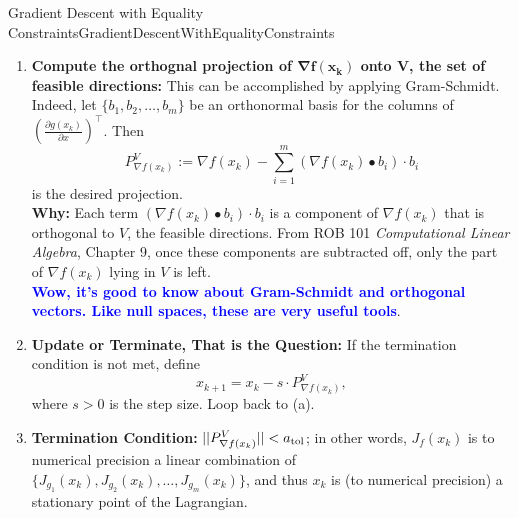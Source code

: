 \begin{methodColor}{Gradient Descent with Equality Constraints}{GradientDescentWithEqualityConstraints}
\begin{enumerate}
   \item \textbf{Compute the orthognal projection of $\bm{\nabla f(x_k)}$ onto $\bm{V}$, the set of feasible directions:}  
   This can be accomplished by applying Gram-Schmidt. Indeed, let $\{b_1, b_2, \ldots, b_m\}$ be an orthonormal basis for the columns of $\left( \frac{\partial g(x_k)}{\partial x} \right)^\top$. Then
    $$P^V_{\nabla f(x_k)}:= \nabla f(x_k) - \sum_{i=1}^m \left(\nabla f(x_k) \bullet b_i \right)\cdot b_i $$
    is the desired projection. \\
    
    \textbf{Why:} Each term $\left(\nabla f(x_k) \bullet b_i \right)\cdot b_i$ is a component of $\nabla f(x_k)$ that is orthogonal to $V$, the feasible directions. From ROB 101 \textit{Computational Linear Algebra}, Chapter 9, once these components are subtracted off, only the part of $\nabla f(x_k)$ lying in $V$ is left.\\

      \textcolor{blue}{\bf Wow, it's good to know about Gram-Schmidt and orthogonal vectors. Like null spaces, these are very useful tools}.

    \item \textbf{Update or Terminate, That is the Question:} If the termination condition is not met, define
    $$x_{k+1} = x_k - s \cdot P^V_{\nabla f(x_k)},$$
    where $s>0$ is the step size. Loop back to (a).

    \item \textbf{Termination Condition:} $||P^V_{\nabla f(x_k)}|| < a_{\rm tol}$; in other words, $J_f(x_k)$ is to numerical precision a linear combination of $\{ J_{g_1}(x_k),  J_{g_2}(x_k), \ldots,  J_{g_m}(x_k)\}$, and thus  $x_k$ is (to numerical precision) a stationary point of the Lagrangian.
\end{enumerate}



\end{methodColor}
